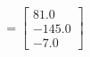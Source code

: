 \documentclass[preview]{standalone}
\begin{document}
\begin{align*}
=\begin{bmatrix} 81.0 \\ -145.0 \\ -7.0 \end{bmatrix}
\end{align*}
\end{document}
